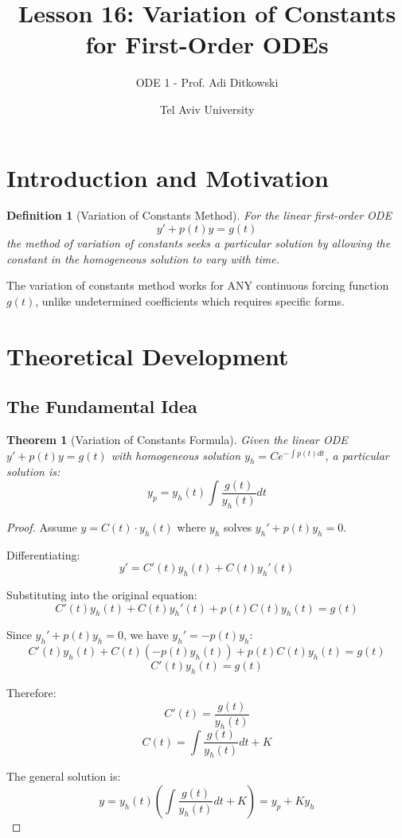 \documentclass[12pt]{article}
\title{Lesson 16: Variation of Constants for First-Order ODEs}
\author{ODE 1 - Prof. Adi Ditkowski}
\date{Tel Aviv University}
\newtheorem{definition}{Definition}
\newtheorem{theorem}{Theorem}
\begin{document}
\maketitle

\section{Introduction and Motivation}

\begin{definition}[Variation of Constants Method]
For the linear first-order ODE
\[y' + p(t)y = g(t)\]
the method of variation of constants seeks a particular solution by allowing the constant in the homogeneous solution to vary with time.
\end{definition}

\begin{keypoint}
The variation of constants method works for ANY continuous forcing function $g(t)$, unlike undetermined coefficients which requires specific forms.
\end{keypoint}

\section{Theoretical Development}

\subsection{The Fundamental Idea}

\begin{theorem}[Variation of Constants Formula]
Given the linear ODE $y' + p(t)y = g(t)$ with homogeneous solution $y_h = Ce^{-\int p(t)dt}$, a particular solution is:
\[y_p = y_h(t) \int \frac{g(t)}{y_h(t)} dt\]
\end{theorem}

\begin{proof}
Assume $y = C(t) \cdot y_h(t)$ where $y_h$ solves $y_h' + p(t)y_h = 0$.

Differentiating:
\[y' = C'(t)y_h(t) + C(t)y_h'(t)\]

Substituting into the original equation:
\[C'(t)y_h(t) + C(t)y_h'(t) + p(t)C(t)y_h(t) = g(t)\]

Since $y_h' + p(t)y_h = 0$, we have $y_h' = -p(t)y_h$:
\[C'(t)y_h(t) + C(t)(-p(t)y_h(t)) + p(t)C(t)y_h(t) = g(t)\]
\[C'(t)y_h(t) = g(t)\]

Therefore:
\[C'(t) = \frac{g(t)}{y_h(t)}\]
\[C(t) = \int \frac{g(t)}{y_h(t)} dt + K\]

The general solution is:
\[y = y_h(t) \left(\int \frac{g(t)}{y_h(t)} dt + K\right) = y_p + Ky_h\]
\end{proof}
\end{document}
